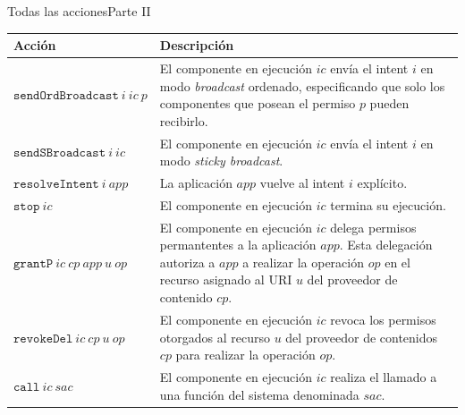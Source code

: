 \documentclass[pdf]{beamer} %
\begin{document}
\begin{frame}{Todas las acciones}{Parte II}
    \fontsize{9pt}{10pt}\selectfont
    \begin{table}
        \begin{tabularx}{\linewidth}{|l X|}
            \hline
            \textbf{Acción}                    & \textbf{Descripción}                                                                                                                                                                                                 \\
            \hline
            $\mathtt{sendOrdBroadcast}~i~ic~p$ & El componente en ejecución $ic$ envía el intent $i$ en modo \textit{broadcast} ordenado,  especificando que solo los componentes que posean el permiso $p$ pueden recibirlo.                                         \\
            \hline
            $\mathtt{sendSBroadcast}~i~ic$     & El componente en ejecución $ic$ envía el intent $i$ en modo \textit{sticky broadcast}.                                                                                                                               \\
            \hline
            $\mathtt{resolveIntent}~i~app$     & La aplicación $app$ vuelve al intent $i$ explícito.                                                                                                                                                                  \\
            \hline
            $\mathtt{stop}~ic$                 & El componente en ejecución $ic$ termina su ejecución.                                                                                                                                                                \\
            \hline
            $\mathtt{grantP}~ic~cp~app~u~op$   & El componente en ejecución $ic$ delega permisos permantentes a la aplicación $app$. Esta delegación autoriza a $app$ a realizar la operación $op$ en el recurso asignado al URI $u$ del proveedor de contenido $cp$. \\
            \hline
            $\mathtt{revokeDel}~ic~cp~u~op$    & El componente en ejecución $ic$ revoca los permisos otorgados al recurso $u$ del proveedor de contenidos $cp$ para realizar la operación $op$.                                                                       \\
            \hline
            $\mathtt{call}~ic~sac$             & El componente en ejecución $ic$ realiza el llamado a una función del sistema denominada $sac$.                                                                                                                       \\
            \hline
        \end{tabularx}
    \end{table}
\end{frame}
\end{document}

